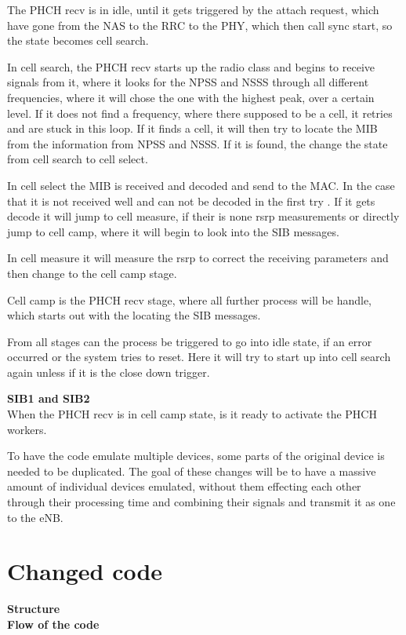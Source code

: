 The PHCH recv is in idle, until it gets triggered by the attach request, which have gone from the NAS to the RRC to the PHY, which then call sync start, so the state becomes cell search.

In cell search, the PHCH recv starts up the radio class and begins to receive signals from it, where it looks for the NPSS and NSSS through all different frequencies, where it will chose the one with the highest peak, over a certain level. If it does not find a frequency, where there supposed to be a cell, it retries and are stuck in this loop. If it finds a cell, it will then try to locate the MIB from the information from NPSS and NSSS. If it is found, the change the state from cell search to cell select.

In cell select the MIB is received and decoded and send to the MAC. In the case that it is not received well and can not be decoded in the first try . If it gets decode it will jump to cell measure, if their is none rsrp measurements  or directly jump to cell camp, where it will begin to look into the SIB messages.

In cell measure it will measure the rsrp to correct the receiving parameters and then change to the cell camp stage.

Cell camp is the PHCH recv stage, where all further process will be handle, which starts out with the locating the SIB messages.

From all stages can the process be triggered to go into idle state, if an error occurred or the system tries to reset. Here it will try to start up into cell search again unless if it is the close down trigger.

\textbf{SIB1 and SIB2} \\
When the PHCH recv is in cell camp state, is it ready to activate the PHCH workers.




















To have the code emulate multiple devices, some parts of the original device is needed to be duplicated. The goal of these changes will be to have a massive amount of individual devices emulated, without them effecting each other through their processing time and combining their signals and transmit it as one to the eNB.

\section{Changed code}

\textbf{Structure}\\
\textbf{Flow of the code}\\

